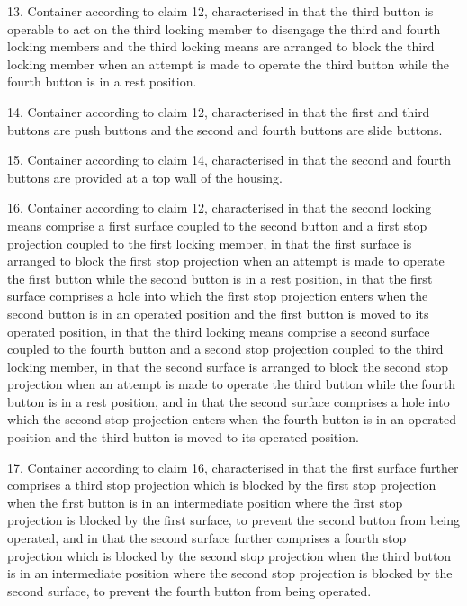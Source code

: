 \documentclass[11pt,a4paper]{article}
\begin{document}
13. Container according to claim 12, characterised in that the third button is operable to act on the third locking member to disengage the third and fourth locking members and the third locking means are arranged to block the third locking member when an attempt is made to operate the third button while the fourth button is in a rest position.

14. Container according to claim 12, characterised in that the first and third buttons are push buttons and the second and fourth buttons are slide buttons.

15. Container according to claim 14, characterised in that the second and fourth buttons are provided at a top wall of the housing.

16. Container according to claim 12, characterised in that the second locking means comprise a first surface coupled to the second button and a first stop projection coupled to the first locking member, in that the first surface is arranged to block the first stop projection when an attempt is made to operate the first button while the second button is in a rest position, in that the first surface comprises a hole into which the first stop projection enters when the second button is in an operated position and the first button is moved to its operated position, in that the third locking means comprise a second surface coupled to the fourth button and a second stop projection coupled to the third locking member, in that the second surface is arranged to block the second stop projection when an attempt is made to operate the third button while the fourth button is in a rest position, and in that the second surface comprises a hole into which the second stop projection enters when the fourth button is in an operated position and the third button is moved to its operated position.

17. Container according to claim 16, characterised in that the first surface further comprises a third stop projection which is blocked by the first stop projection when the first button is in an intermediate position where the first stop projection is blocked by the first surface, to prevent the second button from being operated, and in that the second surface further comprises a fourth stop projection which is blocked by the second stop projection when the third button is in an intermediate position where the second stop projection is blocked by the second surface, to prevent the fourth button from being operated.
\end{document}
